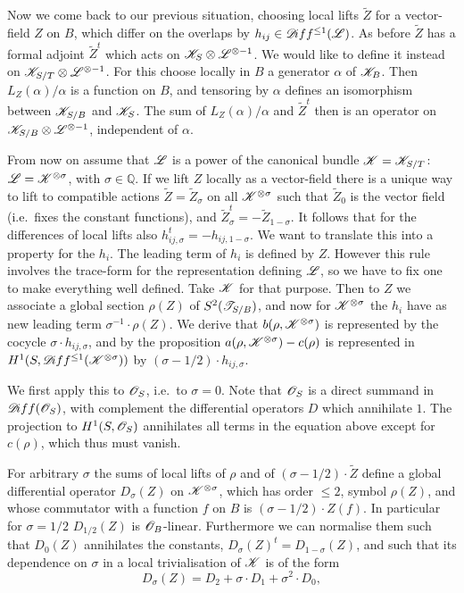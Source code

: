 \documentclass[12pt,english]{smfart}
\theoremstyle{plain} \newtheorem{innerthm}{Theorem} \newtheorem{innerlem}{Lemma} \newtheorem{innerprop}{Proposition} \newtheorem{innercor}{Corollary} \theoremstyle{definition} \newtheorem{innerdefn}{Definition} \newtheorem{innerconstr}{Construction} \theoremstyle{remark} \newtheorem*{remark}{Remark} \newtheorem*{remarks}{Remarks} \newtheorem*{applications}{Applications}
\begin{document}
Now we come back to our previous situation, choosing local lifts $\widetilde{Z}$ for a vector-field $Z$ on $B$, which differ on the overlaps by $h_{ij}\in\mathscr{D}\!iff^{\le 1}(\mathscr{L})$. As before $\widetilde{Z}$ has a formal adjoint $\widetilde{Z}^t$ which acts on $\mathscr{K}_S\otimes\mathscr{L}^{\otimes-1}$. We would like to define it instead on $\mathscr{K}_{S/T}\otimes\mathscr{L}^{\otimes-1}$. For this choose locally in $B$ a generator $\alpha$ of $\mathscr{K}_B$. Then $L_Z(\alpha)/\alpha$ is a function on $B$, and tensoring by $\alpha$ defines an isomorphism between $\mathscr{K}_{S/B}$ and $\mathscr{K}_S$. The sum of $L_Z(\alpha)/\alpha$ and $\widetilde{Z}^t$ then is an operator on $\mathscr{K}_{S/B}\otimes\mathscr{L}^{\otimes-1}$, independent of $\alpha$.

From now on assume that $\mathscr{L}$ is a power of the canonical bundle $\mathscr{K}=\mathscr{K}_{S/T}$: $\mathscr{L}=\mathscr{K}^{\otimes\sigma}$, with $\sigma\in\mathbb{Q}$. If we lift $Z$ locally as a vector-field there is a unique way to lift to compatible actions $\widetilde{Z}=\widetilde{Z}_\sigma$ on all $\mathscr{K}^{\otimes\sigma}$ such that $\widetilde{Z}_0$ is the vector field (i.e.\ fixes the constant functions), and $\widetilde{Z}^t_\sigma=-\widetilde{Z}_{1-\sigma}$. It follows that for the differences of local lifts also $h^t_{ij,\sigma}=-h_{ij,1-\sigma}$. We want to translate this into a property for the $h_i$. The leading term of $h_i$ is defined by $Z$. However this rule involves the trace-form for the representation defining $\mathscr{L}$, so we have to fix one to make everything well defined. Take $\mathscr{K}$ for that purpose. Then to $Z$ we associate a global section $\rho(Z)$ of $S^2(\mathscr{T}_{S/B})$, and now for $\mathscr{K}^{\otimes\sigma}$ the $h_i$ have as new leading term $\sigma^{-1}\cdot\rho(Z)$. We derive that $b(\rho,\mathscr{K}^{\otimes\sigma})$ is represented by the cocycle $\sigma\cdot h_{ij,\sigma}$, and by the proposition $a(\rho,\mathscr{K}^{\otimes\sigma})-c(\rho)$ is represented in $H^1(S,\mathscr{D}\!iff^{\le 1}(\mathscr{K}^{\otimes\sigma}))$ by $(\sigma-1/2)\cdot h_{ij,\sigma}$.

We first apply this to $\mathscr{O}_S$, i.e.\ to $\sigma=0$. Note that $\mathscr{O}_S$ is a direct summand in $\mathscr{D}\!iff(\mathscr{O}_S)$, with complement the differential operators $D$ which annihilate $1$. The projection to $H^1(S,\mathscr{O}_S)$ annihilates all terms in the equation above except for $c(\rho)$, which thus must vanish.

For arbitrary $\sigma$ the sums of local lifts of $\rho$ and of $(\sigma-1/2)\cdot\widetilde{Z}$ define a global differential operator $D_\sigma(Z)$ on $\mathscr{K}^{\otimes\sigma}$, which has order $\le 2$, symbol $\rho(Z)$, and whose commutator with a function $f$ on $B$ is $(\sigma-1/2)\cdot Z(f)$. In particular for $\sigma=1/2$ $D_{1/2}(Z)$ is $\mathscr{O}_B$-linear. Furthermore we can normalise them such that $D_0(Z)$ annihilates the constants, $D_\sigma(Z)^t=D_{1-\sigma}(Z)$, and such that its dependence on $\sigma$ in a local trivialisation of $\mathscr{K}$ is of the form
\[
D_\sigma(Z)=D_2+\sigma\cdot D_1+\sigma^2\cdot D_0,
\]
\end{document}
